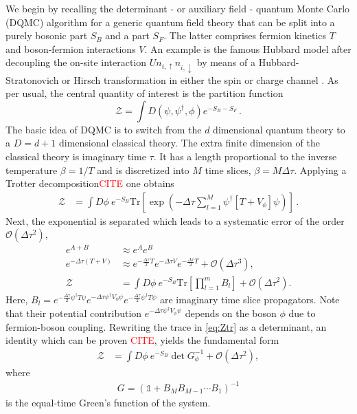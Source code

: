 \documentclass[%
 reprint,
superscriptaddress,
citeautoscript,
showpacs,
 amsmath,amssymb,
 aps,
 prb,
longbibliography,
]{revtex4-2}
\begin{document}
We begin by recalling the determinant - or auxiliary field - quantum Monte Carlo (DQMC) algorithm \cite{Blankenbecler1981} for a generic quantum field theory that can be split into a purely bosonic part $S_B$ and a part $S_F$. The latter comprises fermion kinetics $T$ and boson-fermion interactions $V$. An example is the famous Hubbard model after decoupling the on-site
interaction $U n_{i, \uparrow} n_{i, \downarrow}$ by means of a Hubbard-Stratonovich or Hirsch transformation in either the spin or charge channel \cite{Hirsch1983}. As per usual, the central quantity of interest is the partition function
%
\begin{equation}
\mathcal{Z} = \int D\left( \psi, \psi^\dagger, \phi \right) e^{-S_B - S_F} \,.
\end{equation}
%
The basic idea of DQMC is to switch from the $d$ dimensional quantum theory to a $D = d + 1$ dimensional classical theory. The extra finite dimension of the classical theory is imaginary time $\tau$. It has a length proportional to the inverse temperature $\beta = 1/T$ and is discretized into $M$ time slices, $\beta = M \Delta \tau$. Applying a Trotter decomposition\textcolor{red}{CITE} one obtains
%
\begin{align}
	\mathcal{Z} &= \int D\phi \ e^{-S_B} \mathrm{Tr}{\left[\exp{\left( -\Delta\tau \sum_{l=1}^M \psi^\dagger \left[T + V_\phi\right] \psi \right)}\right]} \label{eq:discretizedpi} \,.
\end{align}
%
Next, the exponential is separated which leads to a systematic error of the order $\mathcal{O}\left(\Delta\tau^2\right)$,
\begin{align}
	e^{A + B} &\approx e^A e^B \quad \nonumber\\
	e^{-\Delta\tau (T + V)} &\approx e^{- \frac{\Delta\tau}{2}T} e^{-\Delta\tau V} e^{- \frac{\Delta\tau}{2}T} + \mathcal{O}\left(\Delta\tau^3\right), \nonumber\\
	\mathcal{Z} &= \int D\phi \ e^{-S_B} \mathrm{Tr}{\left[ \prod_{l=1}^{m} B_l \right]} + \mathcal{O}\left(\Delta\tau^2\right). \label{eq:Ztr}
\end{align}
%
Here, $B_l = e^{- \frac{\Delta\tau}{2}\psi^\dagger T \psi} e^{-\Delta\tau \psi^\dagger V_\phi \psi} e^{- \frac{\Delta\tau}{2}\psi^\dagger T \psi}$ are imaginary time slice propagators. Note that their potential contribution $e^{-\Delta\tau \psi^\dagger V_\phi \psi}$ depends on the boson $\phi$ due to fermion-boson coupling. Rewriting the trace in \eqref{eq:Ztr} as a determinant, an identity which can be proven \textcolor{red}{CITE}, yields the fundamental form
%
\begin{align}
	\mathcal{Z} &= \int D\phi \ e^{-S_B} \det{G_\phi^{-1}} + \mathcal{O}\left(\Delta\tau^2\right), \label{eq:DQMC}
\end{align}
%
where
\begin{align}
	G = \left( \mathbb{1} + B_M B_{M-1} \cdots B_1 \right)^{-1} \label{etgf}
\end{align}
is the equal-time Green's function of the system.
\end{document}
